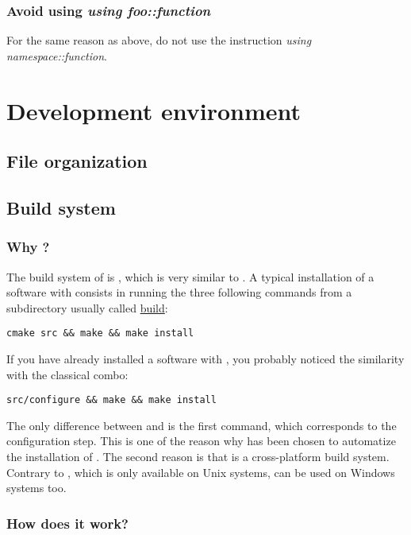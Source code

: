 \subsection{Avoid using \textit{using foo::function}} 

For the same reason as above, do not use the instruction \textit{using namespace::function}.




\chapter{Development environment}

\section{File organization}
\section{Build system}

\subsection{Why \CMake?}

The build system of \Simol is \CMake, which is very similar to \Make. A typical installation of a software with \CMake consists in running the three following commands from a subdirectory usually called \url{build}: 
\lstset{language=bash} 
\begin{lstlisting}
cmake src && make && make install
\end{lstlisting}
If you have already installed a software with \Make, you probably noticed the similarity with the classical combo:
\lstset{language=bash} 
\begin{lstlisting}
src/configure && make && make install
\end{lstlisting}
The only difference between \Make and \CMake is the first command, which corresponds to the configuration step. This is one of the reason why \CMake has been chosen to automatize the installation of \Simol. The second reason is that \CMake is a cross-platform build system. Contrary to \Make, which is only available on Unix systems, \CMake can be used on Windows systems too.

\subsection{How does it work?}

